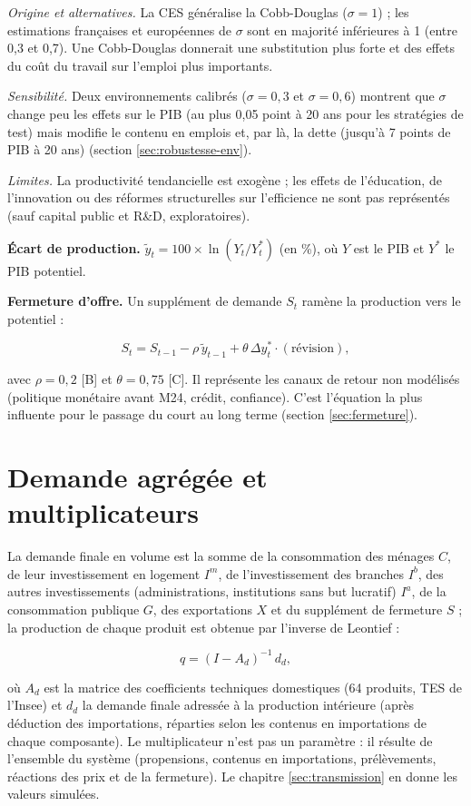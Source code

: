 \documentclass[
  11pt,
  11pt,
  a4paper,
  openany]{book}
\begin{document}
\emph{Origine et alternatives.} La CES généralise la Cobb-Douglas
(\(\sigma = 1\)) ; les estimations françaises et européennes de
\(\sigma\) sont en majorité inférieures à 1 (entre 0,3 et 0,7). Une
Cobb-Douglas donnerait une substitution plus forte et des effets du coût
du travail sur l'emploi plus importants.

\emph{Sensibilité.} Deux environnements calibrés (\(\sigma = 0{,}3\) et
\(\sigma = 0{,}6\)) montrent que \(\sigma\) change peu les effets sur le
PIB (au plus 0,05 point à 20 ans pour les stratégies de test) mais
modifie le contenu en emplois et, par là, la dette (jusqu'à 7 points de
PIB à 20 ans) (section \ref{sec:robustesse-env}).

\emph{Limites.} La productivité tendancielle est exogène ; les effets de
l'éducation, de l'innovation ou des réformes structurelles sur
l'efficience ne sont pas représentés (sauf capital public et R\&D,
exploratoires).

\textbf{Écart de production.}
\(\tilde y_t = 100 \times \ln(Y_t / Y^*_t)\) (en \%), où \(Y\) est le
PIB et \(Y^*\) le PIB potentiel.

\textbf{Fermeture d'offre.} Un supplément de demande \(S_t\) ramène la
production vers le potentiel :

\[S_t = S_{t-1} - \rho\,\tilde y_{t-1} + \theta\,\Delta y^*_t \cdot (\text{révision}),\]

avec \(\rho = 0{,}2\) {[}B{]} et \(\theta = 0{,}75\) {[}C{]}. Il
représente les canaux de retour non modélisés (politique monétaire avant
M24, crédit, confiance). C'est l'équation la plus influente pour le
passage du court au long terme (section \ref{sec:fermeture}).

\hypertarget{sec:eq-demande}{%
\section{Demande agrégée et multiplicateurs}\label{sec:eq-demande}}

La demande finale en volume est la somme de la consommation des ménages
\(C\), de leur investissement en logement \(I^m\), de l'investissement
des branches \(I^b\), des autres investissements (administrations,
institutions sans but lucratif) \(I^a\), de la consommation publique
\(G\), des exportations \(X\) et du supplément de fermeture \(S\) ; la
production de chaque produit est obtenue par l'inverse de Leontief :

\[q = (I - A_d)^{-1}\,d_d,\]

où \(A_d\) est la matrice des coefficients techniques domestiques (64
produits, TES de l'Insee) et \(d_d\) la demande finale adressée à la
production intérieure (après déduction des importations, réparties selon
les contenus en importations de chaque composante). Le multiplicateur
n'est pas un paramètre : il résulte de l'ensemble du système
(propensions, contenus en importations, prélèvements, réactions des prix
et de la fermeture). Le chapitre \ref{sec:transmission} en donne les
valeurs simulées.
\end{document}
